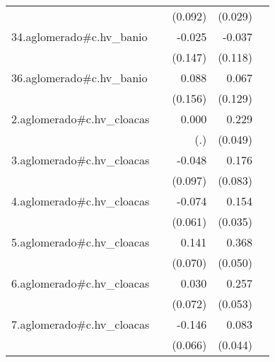 {\begin{longtable}{l*{4}{D{.}{.}{-1}}}
            &                     &     (0.092)         &     (0.029)         &                     \\
\addlinespace
34.aglomerado#c.hv\_banio&                     &      -0.025         &      -0.037         &                     \\
            &                     &     (0.147)         &     (0.118)         &                     \\
\addlinespace
36.aglomerado#c.hv\_banio&                     &       0.088         &       0.067         &                     \\
            &                     &     (0.156)         &     (0.129)         &                     \\
\addlinespace
2.aglomerado#c.hv\_cloacas&                     &       0.000         &       0.229\sym{***}&                     \\
            &                     &         (.)         &     (0.049)         &                     \\
\addlinespace
3.aglomerado#c.hv\_cloacas&                     &      -0.048         &       0.176\sym{*}  &                     \\
            &                     &     (0.097)         &     (0.083)         &                     \\
\addlinespace
4.aglomerado#c.hv\_cloacas&                     &      -0.074         &       0.154\sym{***}&                     \\
            &                     &     (0.061)         &     (0.035)         &                     \\
\addlinespace
5.aglomerado#c.hv\_cloacas&                     &       0.141\sym{*}  &       0.368\sym{***}&                     \\
            &                     &     (0.070)         &     (0.050)         &                     \\
\addlinespace
6.aglomerado#c.hv\_cloacas&                     &       0.030         &       0.257\sym{***}&                     \\
            &                     &     (0.072)         &     (0.053)         &                     \\
\addlinespace
7.aglomerado#c.hv\_cloacas&                     &      -0.146\sym{*}  &       0.083         &                     \\
            &                     &     (0.066)         &     (0.044)         &                     \\

\end{longtable}}
